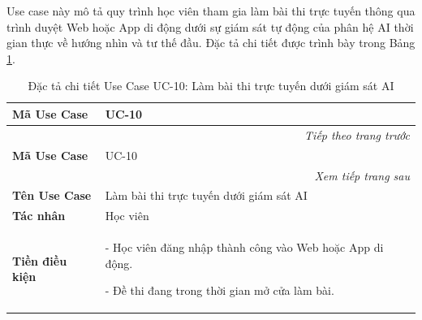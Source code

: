 \documentclass[../DoAn.tex]{subfiles}
\begin{document}
\label{subsection:spec_uc_10}

Use case này mô tả quy trình học viên tham gia làm bài thi trực tuyến thông qua trình duyệt Web hoặc App di động dưới sự giám sát tự động của phân hệ AI thời gian thực về hướng nhìn và tư thế đầu. Đặc tả chi tiết được trình bày trong Bảng \ref{table:spec_uc_10}.

\begin{longtable}{|p{2.8cm}|p{0.8cm}|p{2.2cm}|p{7.5cm}|}
    \caption{Đặc tả chi tiết Use Case UC-10: Làm bài thi trực tuyến dưới giám sát AI}
    \label{table:spec_uc_10} \\
    \hline
    \textbf{Mã Use Case} & \multicolumn{3}{l|}{UC-10} \\ \hline
    \endfirsthead
    \multicolumn{4}{r}{\textit{Tiếp theo trang trước}} \\
    \hline
    \textbf{Mã Use Case} & \multicolumn{3}{l|}{UC-10} \\ \hline
    \endhead
    \hline
    \multicolumn{4}{r}{\textit{Xem tiếp trang sau}} \\
    \endfoot
    \hline
    \endlastfoot
    \textbf{Tên Use Case} & \multicolumn{3}{l|}{Làm bài thi trực tuyến dưới giám sát AI} \\ \hline
    \textbf{Tác nhân} & \multicolumn{3}{l|}{Học viên} \\ \hline
    \textbf{Tiền điều kiện} & \multicolumn{3}{p{10.9cm}|}{- Học viên đăng nhập thành công vào Web hoặc App di động. 

      - Đề thi đang trong thời gian mở cửa làm bài. 

}
\end{longtable}
\end{document}
